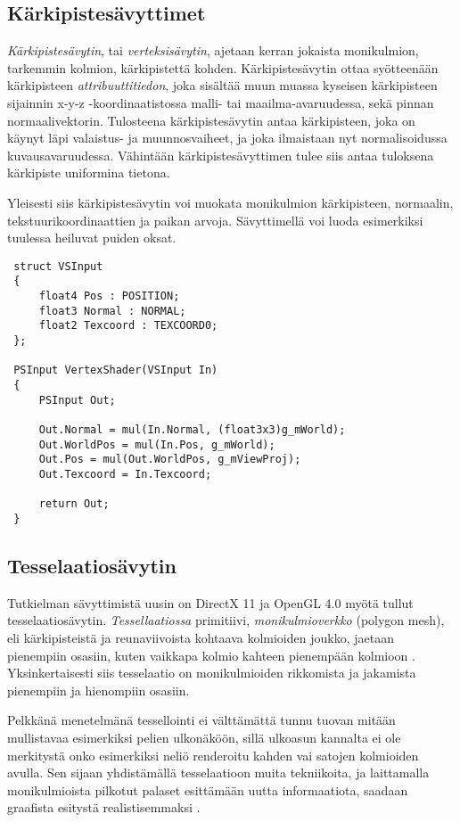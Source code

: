 \documentclass[finnish]{tktltiki2}
\theoremstyle{definition}
\theoremstyle{remark}
\begin{document}
\subsection{Kärkipistesävyttimet}

\emph{Kärkipistesävytin}, tai \emph{verteksisävytin}, ajetaan kerran jokaista monikulmion, tarkemmin kolmion, kärkipistettä kohden. Kärkipistesävytin ottaa syötteenään kärkipisteen \emph{attribuuttitiedon}, joka sisältää muun muassa kyseisen kärkipisteen sijainnin x-y-z -koordinaatistossa malli- tai maailma-avaruudessa, sekä pinnan normaalivektorin. Tulosteena kärkipistesävytin antaa kärkipisteen, joka on käynyt läpi valaistus- ja muunnosvaiheet, ja joka ilmaistaan nyt normalisoidussa kuvausavaruudessa. Vähintään kärkipistesävyttimen tulee siis antaa tuloksena kärkipiste uniformina tietona. \cite{Puh08}

Yleisesti siis kärkipistesävytin voi muokata monikulmion kärkipisteen, normaalin, tekstuurikoordinaattien ja paikan arvoja. Sävyttimellä voi luoda esimerkiksi tuulessa heiluvat puiden oksat.

\begin{lstlisting}
 struct VSInput
 {
	 float4 Pos : POSITION;
	 float3 Normal : NORMAL;
	 float2 Texcoord : TEXCOORD0;
 };
 
 PSInput VertexShader(VSInput In)
 {
	 PSInput Out;	
	
	 Out.Normal = mul(In.Normal, (float3x3)g_mWorld);
	 Out.WorldPos = mul(In.Pos, g_mWorld);	
	 Out.Pos = mul(Out.WorldPos, g_mViewProj);	
	 Out.Texcoord = In.Texcoord;		
		
	 return Out;
 }
\end{lstlisting}

\subsection{Tesselaatiosävytin}

Tutkielman sävyttimistä uusin on DirectX 11 ja OpenGL 4.0 myötä tullut tesselaatiosävytin. \emph{Tessellaatiossa} primitiivi, \emph{monikulmioverkko} (polygon mesh), eli kärkipisteistä ja reunaviivoista kohtaava kolmioiden joukko\cite{Puh08}, jaetaan pienempiin osasiin, kuten vaikkapa kolmio kahteen pienempään kolmioon \cite{Nvi10}. Yksinkertaisesti siis tesselaatio on monikulmioiden rikkomista ja jakamista pienempiin ja hienompiin osasiin. 

Pelkkänä menetelmänä tessellointi ei välttämättä tunnu tuovan mitään mullistavaa esimerkiksi pelien ulkonäköön, sillä ulkoasun kannalta ei ole merkitystä onko esimerkiksi neliö renderoitu kahden vai satojen kolmioiden avulla. Sen sijaan yhdistämällä tesselaatioon muita tekniikoita, ja laittamalla monikulmioista pilkotut palaset esittämään uutta informaatiota, saadaan graafista esitystä realistisemmaksi \cite{Nvi10}. 
\end{document}
